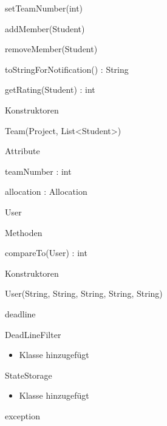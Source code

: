 \documentclass[parskip=full]{scrartcl}
\begin{document}
\begin{itemPackage}
\begin{itemClass}
\begin{itemClassSub}
\begin{itemPlus}
\item setTeamNumber(int)
\item addMember(Student)
\item removeMember(Student)
\item toStringForNotification() : String
\end{itemPlus}
\begin{itemMinus}
\item getRating(Student) : int
\end{itemMinus}
\item Konstruktoren
\begin{itemPlus}
\item Team(Project, List<Student>)
\end{itemPlus}
\item Attribute 
\begin{itemPlus}
\item teamNumber : int
\item allocation : Allocation
\end{itemPlus}
\end{itemClassSub}
\item User
\begin{itemClassSub}
\item Methoden
\begin{itemPlus}
\item compareTo(User) : int
\end{itemPlus}
\item Konstruktoren
\begin{itemPlus}
\item User(String, String, String, String, String)
\end{itemPlus}
\end{itemClassSub}
\end{itemClass}
\item deadline
	\begin{itemClass}
	\item DeadLineFilter
	\begin{itemize}
	  \item Klasse hinzugefügt
	\end{itemize}
	\item StateStorage
	\begin{itemize}
	  \item Klasse hinzugefügt
	\end{itemize}
	\end{itemClass}
\item exception
\begin{itemClass}

\end{itemClass}
\end{itemPackage}
\end{document}
